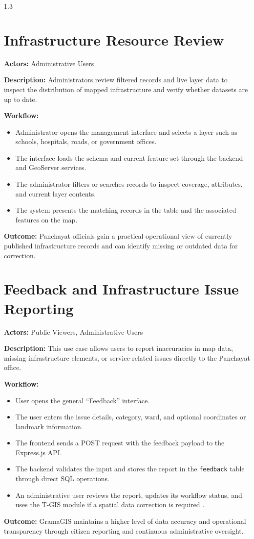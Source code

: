 \begin{spacing}{1.3}
\section{Infrastructure Resource Review}

\textbf{Actors:} Administrative Users

\textbf{Description:}
Administrators review filtered records and live layer data to inspect the distribution of mapped infrastructure and verify whether datasets are up to date.

\textbf{Workflow:}
\begin{itemize}
    \item Administrator opens the management interface and selects a layer such as schools, hospitals, roads, or government offices.
    \item The interface loads the schema and current feature set through the backend and GeoServer services.
    \item The administrator filters or searches records to inspect coverage, attributes, and current layer contents.
    \item The system presents the matching records in the table and the associated features on the map.
\end{itemize}

\textbf{Outcome:}
Panchayat officials gain a practical operational view of currently published infrastructure records and can identify missing or outdated data for correction.

\section{Feedback and Infrastructure Issue Reporting}

\textbf{Actors:} Public Viewers, Administrative Users

\textbf{Description:}
This use case allows users to report inaccuracies in map data, missing infrastructure elements, or service-related issues directly to the Panchayat office.

\textbf{Workflow:}
\begin{itemize}
    \item User opens the general ``Feedback'' interface.
    \item The user enters the issue details, category, ward, and optional coordinates or landmark information.
    \item The frontend sends a POST request with the feedback payload to the Express.js API.
    \item The backend validates the input and stores the report in the \texttt{feedback} table through direct SQL operations.
    \item An administrative user reviews the report, updates its workflow status, and uses the T-GIS module if a spatial data correction is required \cite{smart_panchayat2023}.
\end{itemize}

\textbf{Outcome:}
GramaGIS maintains a higher level of data accuracy and operational transparency through citizen reporting and continuous administrative oversight.

\end{spacing}
